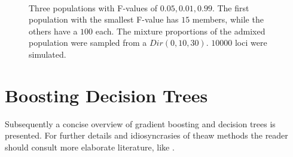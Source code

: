 \documentclass[a4paper, 11pt]{article}
\begin{document}
\begin{figure}[h!]
\\Three populations with F-values  of $0.05, 0.01, 0.99$. The first population with the smallest F-value has $15$ members, while the others have a $100$ each. The mixture proportions of the admixed population were sampled from a $Dir(0, 10, 30)$. $10000$ loci were simulated.

\centering
\end{figure}


\newpage









\section{Boosting Decision Trees}
Subsequently a concise overview of gradient boosting and decision trees is presented. For further details and idiosyncrasies of theaw methods the reader should consult more elaborate literature, like \cite{trevor2009elements}.
\end{document}
